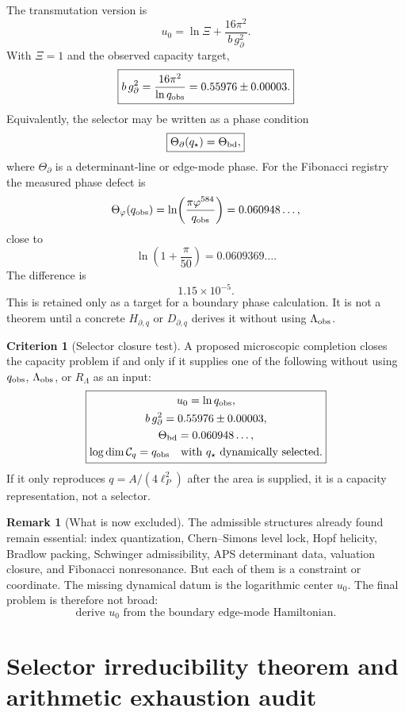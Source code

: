 \documentclass[aps,prd,reprint,nofootinbib,superscriptaddress,floatfix]{revtex4-2}
\numberwithin{equation}{section}
\theoremstyle{definition}
\newtheorem{criterion}{Criterion}[section]
\newtheorem{remark}{Remark}[section]
\theoremstyle{plain}
\begin{document}
The transmutation version is
\[
\boxed{
u_0
=
\ln\Xi+\frac{16\pi^2}{b\,g_\partial^2}.
}
\]
With \(\Xi=1\) and the observed capacity target,
\[
\boxed{
b\,g_\partial^2
=
\frac{16\pi^2}{\ln q_{\rm obs}}
=
0.55976\pm0.00003 .
}
\]
Equivalently, the selector may be written as a phase condition
\[
\boxed{
\Theta_{\partial}(q_\star)
=
\Theta_{\rm bd},
}
\]
where \(\Theta_{\partial}\) is a determinant-line or edge-mode phase.
For the Fibonacci registry the measured phase defect is
\[
\Theta_\varphi(q_{\rm obs})
=
\ln\!\left(\frac{\pi\varphi^{584}}{q_{\rm obs}}\right)
=
0.060948\ldots ,
\]
close to
\[
\ln\!\left(1+\frac{\pi}{50}\right)=0.0609369\ldots .
\]
The difference is
\[
1.15\times10^{-5}.
\]
This is retained only as a target for a boundary phase calculation.  It
is not a theorem until a concrete \(H_{\partial,q}\) or \(D_{\partial,q}\)
derives it without using \(\Lambda_{\rm obs}\).

\begin{criterion}[Selector closure test]
A proposed microscopic completion closes the capacity problem if and
only if it supplies one of the following without using \(q_{\rm obs}\),
\(\Lambda_{\rm obs}\), or \(R_\Lambda\) as an input:
\[
\boxed{
\begin{gathered}
u_0=\ln q_{\rm obs},\\
b\,g_\partial^2=0.55976\pm0.00003,\\
\Theta_{\rm bd}=0.060948\ldots,\\
\log\dim\mathcal C_q=q_{\rm obs}
\quad\text{with }q_\star\text{ dynamically selected.}
\end{gathered}}
\]
If it only reproduces \(q=A/(4\ell_P^2)\) after the area is supplied,
it is a capacity representation, not a selector.
\end{criterion}

\begin{remark}[What is now excluded]
The admissible structures already found remain essential:
index quantization, Chern--Simons level lock, Hopf helicity, Bradlow
packing, Schwinger admissibility, APS determinant data, valuation
closure, and Fibonacci nonresonance.  But each of them is a constraint
or coordinate.  The missing dynamical datum is the logarithmic center
\(u_0\).  The final problem is therefore not broad:
\[
\boxed{
\text{derive }u_0\text{ from the boundary edge-mode Hamiltonian.}
}
\]
\end{remark}


\section{Selector irreducibility theorem and arithmetic exhaustion audit}
\label{sec:selector-irreducibility}
\end{document}
